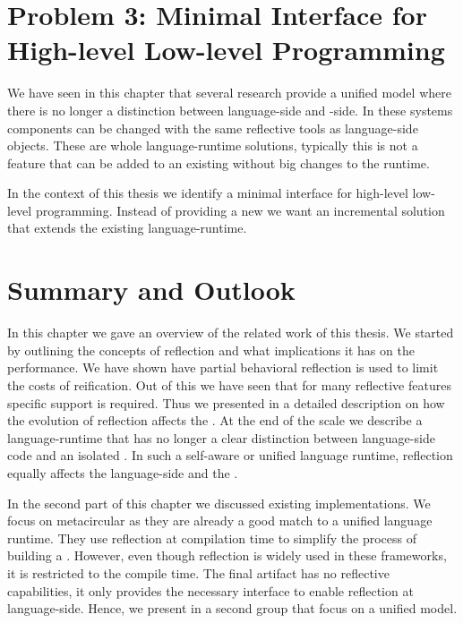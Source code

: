 \section{Problem 3: Minimal Interface for High-level Low-level Programming}
We have seen in this chapter that several research \VMs provide a unified model where there is no longer a distinction between language-side and \VM-side.
In these systems \VM components can be changed with the same reflective tools as language-side objects.
These are whole language-runtime solutions, typically this is not a feature that can be added to an existing \VM without big changes to the runtime.

In the context of this thesis we identify a minimal interface for high-level low-level programming.
Instead of providing a new \VM we want an incremental solution that extends the existing language-runtime.


\section{Summary and Outlook}

In this chapter we gave an overview of the related work of this thesis.
We started by outlining the concepts of reflection and what implications it has on the performance.
We have shown have partial behavioral reflection is used to limit the costs of reification.
Out of this we have seen that for many reflective features specific \VM support is required.
Thus we presented in  a detailed description on how the evolution of reflection affects the \VM.
At the end of the scale we describe a language-runtime that has no longer a clear distinction between language-side code and an isolated \VM.
In such a self-aware \VM or unified language runtime, reflection equally affects the language-side and the \VM.

In the second part of this chapter we discussed existing \VM implementations.
We focus on metacircular \VMs as they are already a good match to a unified language runtime.
They use reflection at compilation time to simplify the process of building a \VM.
However, even though reflection is widely used in these frameworks, it is restricted to the compile time.
The final \VM artifact has no reflective capabilities, it only provides the necessary interface to enable reflection at language-side.
Hence, we present in a second group \VMs that focus on a unified model.


